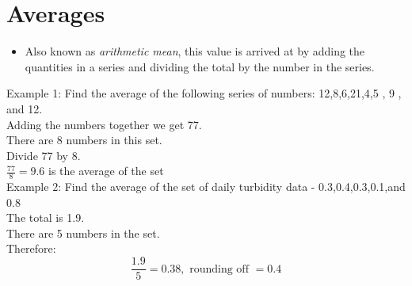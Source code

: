 \section{Averages}
\begin{itemize}
\item Also known as \emph{arithmetic mean}, this value is arrived at by adding the quantities in a series and dividing the total by the number in the series.
\end{itemize}
Example 1: Find the average of the following series of numbers: 12,8,6,21,4,5 , 9 , and 12.\\
Adding the numbers together we get 77.\\
There are 8 numbers in this set.\\
Divide 77 by 8.\\

$\frac{77}{8}=9.6$ is the average of the set\\

Example 2:  Find the average of the set of daily turbidity data - 0.3,0.4,0.3,0.1,and 0.8\\
The total is 1.9.\\
There are 5 numbers in the set.\\
Therefore:
$$
\frac{1.9}{5}=0.38, \text { rounding off }=0.4
$$

\newpage

